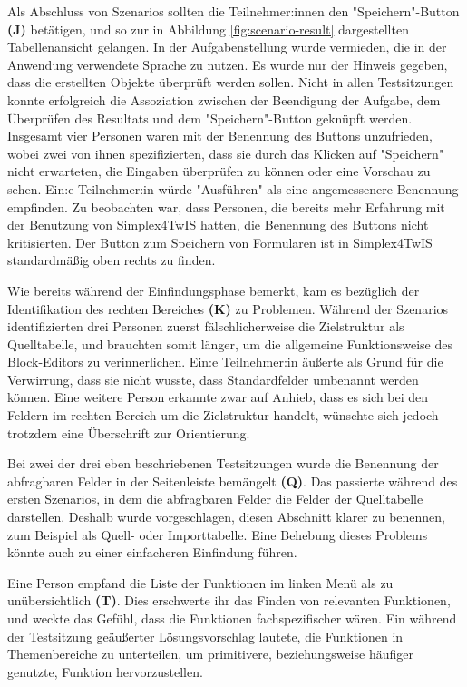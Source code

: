 Als Abschluss von Szenarios sollten die Teilnehmer:innen den "Speichern"-Button \textbf{(J)} betätigen, und so zur in Abbildung \ref{fig:scenario-result} dargestellten Tabellenansicht gelangen. In der Aufgabenstellung wurde vermieden, die in der Anwendung verwendete Sprache zu nutzen. Es wurde nur der Hinweis gegeben, dass die erstellten Objekte überprüft werden sollen. Nicht in allen Testsitzungen konnte erfolgreich die Assoziation zwischen der Beendigung der Aufgabe, dem Überprüfen des Resultats und dem "Speichern"-Button geknüpft werden. Insgesamt vier Personen waren mit der Benennung des Buttons unzufrieden, wobei zwei von ihnen spezifizierten, dass sie durch das Klicken auf "Speichern" nicht erwarteten, die Eingaben überprüfen zu können oder eine Vorschau zu sehen. Ein:e Teilnehmer:in würde "Ausführen" als eine angemessenere Benennung empfinden. Zu beobachten war, dass Personen, die bereits mehr Erfahrung mit der Benutzung von Simplex4TwIS hatten, die Benennung des Buttons nicht kritisierten. Der Button zum Speichern von Formularen ist in Simplex4TwIS standardmäßig oben rechts zu finden.

Wie bereits während der Einfindungsphase bemerkt, kam es bezüglich der Identifikation des rechten Bereiches \textbf{(K)} zu Problemen. Während der Szenarios identifizierten drei Personen zuerst fälschlicherweise die Zielstruktur als Quelltabelle, und brauchten somit länger, um die allgemeine Funktionsweise des Block-Editors zu verinnerlichen. Ein:e Teilnehmer:in äußerte als Grund für die Verwirrung, dass sie nicht wusste, dass Standardfelder umbenannt werden können. Eine weitere Person erkannte zwar auf Anhieb, dass es sich bei den Feldern im rechten Bereich um die Zielstruktur handelt, wünschte sich jedoch trotzdem eine Überschrift zur Orientierung.

Bei zwei der drei eben beschriebenen Testsitzungen wurde die Benennung der abfragbaren Felder in der Seitenleiste bemängelt \textbf{(Q)}. Das passierte während des ersten Szenarios, in dem die abfragbaren Felder die Felder der Quelltabelle darstellen. Deshalb wurde vorgeschlagen, diesen Abschnitt klarer zu benennen, zum Beispiel als Quell- oder Importtabelle. Eine Behebung dieses Problems könnte auch zu einer einfacheren Einfindung führen.

Eine Person empfand die Liste der Funktionen im linken Menü als zu unübersichtlich \textbf{(T)}. Dies erschwerte ihr das Finden von relevanten Funktionen, und weckte das Gefühl, dass die Funktionen fachspezifischer wären. Ein während der Testsitzung geäußerter Lösungsvorschlag lautete, die Funktionen in Themenbereiche zu unterteilen, um primitivere, beziehungsweise häufiger genutzte, Funktion hervorzustellen.


